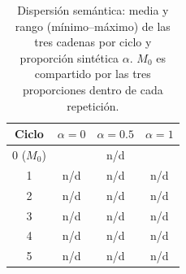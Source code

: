 
\begin{table}[ht]
\centering
\footnotesize
\begin{tabular}{c c c c}
\hline
Ciclo & $\alpha=0$ & $\alpha=0.5$ & $\alpha=1$ \\
\hline
0 ($M_0$) & \multicolumn{3}{c}{n/d} \\
1 & n/d & n/d & n/d \\
2 & n/d & n/d & n/d \\
3 & n/d & n/d & n/d \\
4 & n/d & n/d & n/d \\
5 & n/d & n/d & n/d \\
\hline
\end{tabular}
\caption{Dispersión semántica: media y rango (mínimo--máximo) de las tres cadenas por ciclo y proporción sintética $\alpha$. $M_0$ es compartido por las tres proporciones dentro de cada repetición.}
\label{tab:medias_semantic_dispersion}
\end{table}
